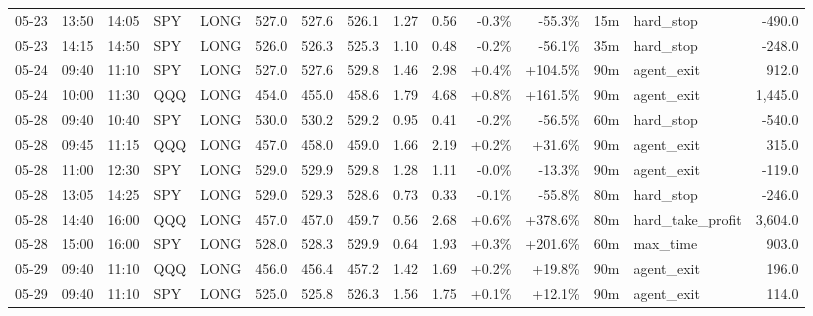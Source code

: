 \documentclass[11pt,a4paper,twoside]{article}
\begin{document}
\begin{landscape}
\begin{center}
\begin{longtable}{>{\color{txtmain}}l l l l l r r r r r r r r >{\color{txtmain}}l r}
05-23 & 13:50 & 14:05 & SPY & LONG & 527.0 & 527.6 & 526.1 & 1.27 & 0.56 & \textcolor{lossred}{-0.3\%} & \textcolor{lossred}{-55.3\%} & 15m & hard\_stop & \textcolor{lossred}{-490.0} \\
05-23 & 14:15 & 14:50 & SPY & LONG & 526.0 & 526.3 & 525.3 & 1.10 & 0.48 & \textcolor{lossred}{-0.2\%} & \textcolor{lossred}{-56.1\%} & 35m & hard\_stop & \textcolor{lossred}{-248.0} \\
05-24 & 09:40 & 11:10 & SPY & LONG & 527.0 & 527.6 & 529.8 & 1.46 & 2.98 & \textcolor{wingreen}{+0.4\%} & \textcolor{wingreen}{+104.5\%} & 90m & agent\_exit & \textcolor{wingreen}{912.0} \\
05-24 & 10:00 & 11:30 & QQQ & LONG & 454.0 & 455.0 & 458.6 & 1.79 & 4.68 & \textcolor{wingreen}{+0.8\%} & \textcolor{wingreen}{+161.5\%} & 90m & agent\_exit & \textcolor{wingreen}{1,445.0} \\
05-28 & 09:40 & 10:40 & SPY & LONG & 530.0 & 530.2 & 529.2 & 0.95 & 0.41 & \textcolor{lossred}{-0.2\%} & \textcolor{lossred}{-56.5\%} & 60m & hard\_stop & \textcolor{lossred}{-540.0} \\
05-28 & 09:45 & 11:15 & QQQ & LONG & 457.0 & 458.0 & 459.0 & 1.66 & 2.19 & \textcolor{wingreen}{+0.2\%} & \textcolor{wingreen}{+31.6\%} & 90m & agent\_exit & \textcolor{wingreen}{315.0} \\
05-28 & 11:00 & 12:30 & SPY & LONG & 529.0 & 529.9 & 529.8 & 1.28 & 1.11 & \textcolor{lossred}{-0.0\%} & \textcolor{lossred}{-13.3\%} & 90m & agent\_exit & \textcolor{lossred}{-119.0} \\
05-28 & 13:05 & 14:25 & SPY & LONG & 529.0 & 529.3 & 528.6 & 0.73 & 0.33 & \textcolor{lossred}{-0.1\%} & \textcolor{lossred}{-55.8\%} & 80m & hard\_stop & \textcolor{lossred}{-246.0} \\
05-28 & 14:40 & 16:00 & QQQ & LONG & 457.0 & 457.0 & 459.7 & 0.56 & 2.68 & \textcolor{wingreen}{+0.6\%} & \textcolor{wingreen}{+378.6\%} & 80m & hard\_take\_profit & \textcolor{wingreen}{3,604.0} \\
05-28 & 15:00 & 16:00 & SPY & LONG & 528.0 & 528.3 & 529.9 & 0.64 & 1.93 & \textcolor{wingreen}{+0.3\%} & \textcolor{wingreen}{+201.6\%} & 60m & max\_time & \textcolor{wingreen}{903.0} \\
05-29 & 09:40 & 11:10 & QQQ & LONG & 456.0 & 456.4 & 457.2 & 1.42 & 1.69 & \textcolor{wingreen}{+0.2\%} & \textcolor{wingreen}{+19.8\%} & 90m & agent\_exit & \textcolor{wingreen}{196.0} \\
05-29 & 09:40 & 11:10 & SPY & LONG & 525.0 & 525.8 & 526.3 & 1.56 & 1.75 & \textcolor{wingreen}{+0.1\%} & \textcolor{wingreen}{+12.1\%} & 90m & agent\_exit & \textcolor{wingreen}{114.0} \\

\end{longtable}
\end{center}
\end{landscape}
\end{document}
